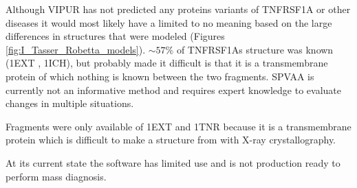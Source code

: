 %
%
 
Although VIPUR has not predicted any proteins variants of TNFRSF1A or other diseases it would most likely have a limited to no meaning based on the large differences in structures that were modeled (Figures \ref{fig:I_Tasser_Robetta_models}). $\sim57\%$ of TNFRSF1As structure was known (1EXT\cite{naismith_structures_1996} , 1ICH\cite{sukits_solution_2001}), but probably made it difficult is that it is a transmembrane protein of which nothing is known between the two fragments.
SPVAA is currently not an informative method and requires expert knowledge to evaluate changes in multiple situations.

Fragments were only available of 1EXT and 1TNR because it is a transmembrane protein which is difficult to make a structure from with X-ray crystallography.

At its current state the software has limited use and is not production ready to perform mass diagnosis.

%
